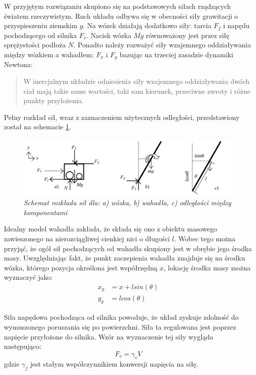 \documentclass[12pt, twoside, openany]{report}
\theoremstyle{definition}
\begin{document}
W przyjętym rozwiązaniu skupiono się na podstawowych siłach rządzących światem rzeczywistym. Ruch układu odbywa się w obecności siły grawitacji o przyspieszeniu ziemskim $g$. Na wózek działają dodatkowo siły: tarcia $F_f$ i napędu pochodzącego od silnika $F_v$. Nacisk wózka $Mg$ równoważony jest przez siłę sprężystości podłoża $N$. Ponadto należy rozważyć siły wzajemnego oddziaływania między wózkiem a wahadłem: $F_x$ i $F_y$ bazując na trzeciej zasadzie dynamiki Newtona:
\begin{quote}
W inercjalnym układzie odniesienia siły wzajemnego oddziaływania dwóch ciał mają takie same wartości, taki sam kierunek, przeciwne zwroty i różne punkty przyłożenia.
\end{quote}

Pełny rozkład sił, wraz z zaznaczeniem użytecznych odległości, przedstawiony został na schemacie \ref{SystemForces}.

\begin{figure}[H]
	\centering
		\includegraphics[width = 400pt]{SystemForces} 
		\caption{\textit{Schemat rozkładu sił dla: a) wózka, b) wahadła, c) odległości między komponentami \cite{LMIP}}}
		\label{SystemForces}
\end{figure}

Idealny model wahadła zakłada, że składa się ono z obiektu masowego zawieszonego na nierozciągliwej cienkiej nici o długości $l$. Wobec tego można przyjąć, że ogół sił pochodzących od wahadła skupiony jest w obrębie jego środka masy. Uwzględniając fakt, że punkt zaczepienia wahadła znajduje się na środku wózka, którego pozycja określona jest współrzędną $x$, lokację środka masy można wyznaczyć jako:
\begin{equation} \label{MassCenter}
\begin{aligned}
x_g &= x + lsin(\theta)\\
y_g &= lcos(\theta)
\end{aligned}
\end{equation}

Siła napędowa pochodząca od silnika powoduje, że układ zyskuje zdolność do wymuszonego poruszania się po powierzchni. Siła ta regulowana jest poprzez napięcie przyłożone do silnika. Wzór na wyznaczenie tej siły wygląda następująco:
\begin{equation} \label{Voltage}
F_v = \gamma_v V
\end{equation}
gdzie $\gamma_f$ jest stałym współczynnikiem konwersji napięcia na siłę.
\end{document}
